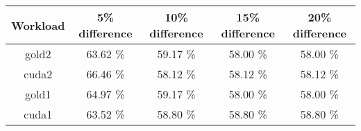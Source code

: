 \begin{tabular}{|c|c|c|c|c|}
\hline
  \textbf{Workload} & \textbf{5\% difference} & \textbf{10\% difference} & \textbf{15\% difference} & \textbf{20\% difference}\\
\hline
\hline
  gold2 & 63.62 \% & 59.17 \% & 58.00 \% & 58.00 \%\\
  cuda2 & 66.46 \% & 58.12 \% & 58.12 \% & 58.12 \%\\
  gold1 & 64.97 \% & 59.17 \% & 58.00 \% & 58.00 \%\\
  cuda1 & 63.52 \% & 58.80 \% & 58.80 \% & 58.80 \%\\
\hline
\end{tabular}
